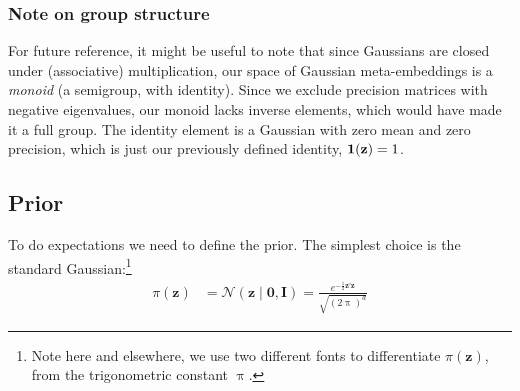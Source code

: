 \documentclass[a4paper,oneside,12pt,english]{report}
\def\zvec{\mathbf{z}}
\def\ND{\mathcal{N}}
\def\Imat{\mathbf{I}}
\def\nulvec{\boldsymbol{0}}
\begin{document}
\subsubsection{Note on group structure}
For future reference, it might be useful to note that since Gaussians are closed under (associative) multiplication, our space of Gaussian meta-embeddings is a \emph{monoid} (a semigroup, with identity). Since we exclude precision matrices with negative eigenvalues, our monoid lacks inverse elements, which would have made it a full group. The identity element is a Gaussian with zero mean and zero precision, which is just our previously defined identity, $\onevec(\zvec)=1$. 


\subsection{Prior}
To do expectations we need to define the prior. The simplest choice is the standard Gaussian:\footnote{Note here and elsewhere, we use two different fonts to differentiate $\pi(\zvec)$, from the trigonometric constant $\uppi$.}
\begin{align}
\pi(\zvec) &= \ND(\zvec\mid\nulvec,\Imat) = \frac{e^{-\frac12\zvec'\zvec}}{\sqrt{(2\uppi)^d}}
\end{align}
\end{document}
